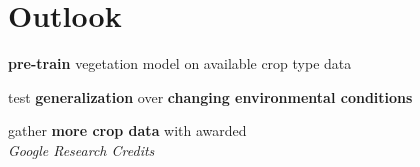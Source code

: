 \documentclass[a0]{tumposter}
\begin{document}
\begin{minipage}[t]{0.32\textwidth}
%	

	
%	
	
%	
%			
%	
%
%	
%	
%	
%	 
%	 
	 \section{Outlook}
	 
	 \begin{minipage}{\textwidth}
	 	
	 	\textbf{pre-train} vegetation model on available crop type data
	 	
	 	test \textbf{generalization} over \textbf{changing environmental conditions}
	 	
	 	gather \textbf{\color{tumblue}more crop data} with awarded \\ \textit{Google Research Credits} 


\end{minipage}
\end{minipage}
\end{document}
